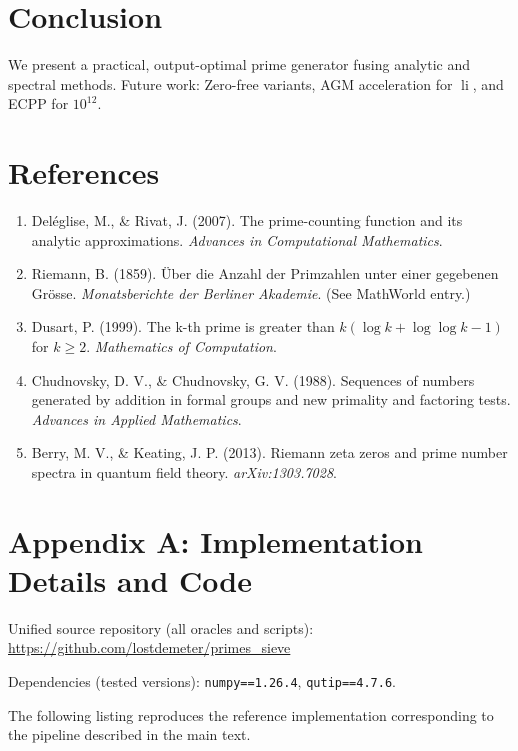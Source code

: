 \documentclass[11pt]{article}
\DeclareMathOperator{\li}{li}
\begin{document}
\section{Conclusion}
We present a practical, output-optimal prime generator fusing analytic and spectral methods. Future work: Zero-free variants, AGM acceleration for $\li$, and ECPP for $10^{12}$.

\section*{References}

\begin{enumerate}
  \item Del\'eglise, M., \& Rivat, J. (2007). The prime-counting function and its analytic approximations. \emph{Advances in Computational Mathematics}.
  \item Riemann, B. (1859). \"Uber die Anzahl der Primzahlen unter einer gegebenen Gr\"osse. \emph{Monatsberichte der Berliner Akademie}. (See MathWorld entry.)
  \item Dusart, P. (1999). The k-th prime is greater than $k(\log k + \log\log k - 1)$ for $k \ge 2$. \emph{Mathematics of Computation}.
  \item Chudnovsky, D. V., \& Chudnovsky, G. V. (1988). Sequences of numbers generated by addition in formal groups and new primality and factoring tests. \emph{Advances in Applied Mathematics}.
  \item Berry, M. V., \& Keating, J. P. (2013). Riemann zeta zeros and prime number spectra in quantum field theory. \emph{arXiv:1303.7028}.
\end{enumerate}

\appendix
\section*{Appendix A: Implementation Details and Code}


Unified source repository (all oracles and scripts): \url{https://github.com/lostdemeter/primes_sieve}

Dependencies (tested versions): \texttt{numpy==1.26.4}, \texttt{qutip==4.7.6}.

\noindent The following listing reproduces the reference implementation corresponding to the pipeline described in the main text.


\end{document}
